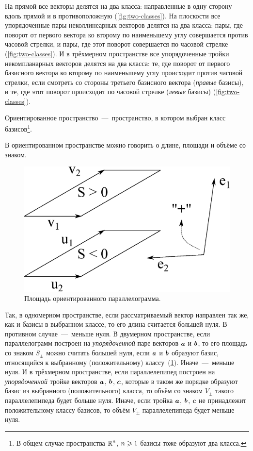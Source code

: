\documentclass[a4paper,12pt]{article}
\begin{document}
  На прямой все векторы делятся на два класса: направленные в одну сторону вдоль прямой и в противоположную (\ref{fig:two-classes}).
  На плоскости все упорядоченные пары неколлинеарных векторов делятся на два класса: пары, где поворот от первого вектора ко второму по наименьшему углу совершается против часовой стрелки, и пары, где этот поворот совершается по часовой стрелке (\ref{fig:two-classes}).
  И в трёхмерном пространстве все упорядоченные тройки некомпланарных векторов делятся на два класса: те, где поворот от первого базисного вектора ко второму по наименьшему углу происходит против часовой стрелки, если смотреть со стороны третьего базисного вектора (\emph{правые} базисы), и те, где этот поворот происходит по часовой стрелке (\emph{левые} базисы) (\ref{fig:two-classes}).
  
  \begin{definition}
    Ориентированное пространство~---~пространство, в котором выбран класс базисов\footnote{В общем случае пространства $\operatorname{\mathbb R}^n$, $n \hm\geq 1$ базисы тоже образуют два класса.}.
  \end{definition}
  
  В ориентированном пространстве можно говорить о длине, площади и объёме со знаком.
  
  \begin{figure}[h]
    \centering
    
    \includegraphics[width=0.5\columnwidth]{two-parallelograms}
    
    \caption{Площадь ориентированного параллелограмма.}
    \label{fig:two-parallelograms}
  \end{figure}
  
  Так, в одномерном пространстве, если рассматриваемый вектор направлен так же, как и базисы в выбранном классе, то его длина считается большей нуля.
  В противном случае~---~меньше нуля.
  В двумерном пространстве, если параллелограмм построен на \emph{упорядоченной} паре векторов $\boldsymbol a$ и $\boldsymbol b$, то его площадь со знаком $S_{\pm}$ можно считать большей нуля, если $\boldsymbol a$ и $\boldsymbol b$ образуют базис, относящийся к выбранному (положительному) классу~(\ref{fig:two-parallelograms}).
  Иначе~---~меньше нуля.
  И в трёхмерном пространстве, если параллелепипед построен на \emph{упорядоченной} тройке векторов $\boldsymbol a$, $\boldsymbol b$, $\boldsymbol c$, которые в таком же порядке образуют базис из выбранного (положительного) класса, то объём со знаком $V_{\pm}$ такого параллелепипеда будет больше нуля.
  Иначе, если тройка $\boldsymbol a$, $\boldsymbol b$, $\boldsymbol c$ не принадлежит положительному классу базисов, то объём $V_{\pm}$ параллелепипеда будет меньше нуля.
  
\end{document}
